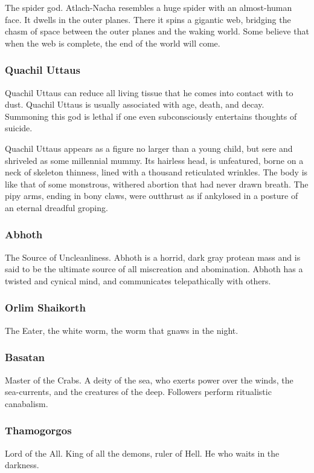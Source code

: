 \documentclass[a4paper]{style/dnd4e}
\begin{document}
The spider god.  Atlach-Nacha resembles a huge spider with an almost-human face. It dwells 
in the outer planes. There it spins a gigantic web, bridging the chasm of space between the 
outer planes and the waking world. Some believe that when the web is complete, the end of the 
world will come.
  

\subsubsection*{Quachil Uttaus}  
  
Quachil Uttaus can reduce all living tissue that he comes into contact with to dust. Quachil 
Uttaus is usually associated with age, death, and decay. Summoning this god is lethal if one 
even subconsciously entertains thoughts of suicide.

Quachil Uttaus appears as a figure no larger than a young child, but sere and shriveled as 
some millennial mummy. Its hairless head, is unfeatured, borne on a neck of skeleton thinness, 
lined with a thousand reticulated wrinkles. The body is like that of some monstrous, withered 
abortion that had never drawn breath. The pipy arms, ending in bony claws, were outthrust as 
if ankylosed in a posture of an eternal dreadful groping.


\subsubsection*{Abhoth}
The Source of Uncleanliness.  Abhoth is a horrid, dark gray protean mass and is said to be 
the ultimate source of all miscreation and abomination.  Abhoth has a twisted and cynical 
mind, and communicates telepathically with others.
  

\subsubsection*{Orlim Shaikorth}
The Eater, the white worm, the worm that gnaws in the night.  


\subsubsection*{Basatan}
Master of the Crabs. A deity of the sea, who exerts power over 
the winds, the sea-currents, and the creatures of the deep.    Followers perform ritualistic canabalism.


\subsubsection*{Thamogorgos}
Lord of the All.  King of all the demons, ruler of Hell.  He who waits in the darkness.
  
\end{document}
